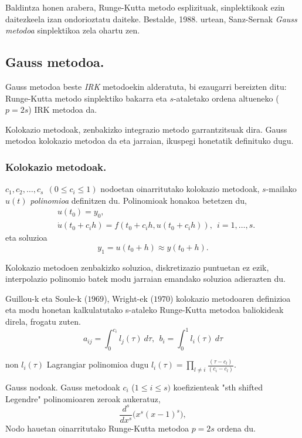 Baldintza honen arabera, Runge-Kutta metodo esplizituak, sinplektikoak ezin daitezkeela izan ondorioztatu daiteke. Bestalde, 1988. urtean, Sanz-Sernak \emph{Gauss metodoa} sinplektikoa zela ohartu zen. 

\subsection{Gauss metodoa.}

Gauss metodoa beste \emph{IRK} metodoekin alderatuta, bi ezaugarri bereizten ditu:  Runge-Kutta metodo sinplektiko bakarra eta $s$-ataletako ordena altueneko ($p=2s$) IRK metodoa da. 

Kolokazio metodoak, zenbakizko integrazio metodo garrantzitsuak dira. Gauss metodoa kolokazio metodoa da eta jarraian, ikuspegi honetatik definituko dugu. 

\subsubsection*{Kolokazio metodoak.}

$c_1,c_2,\dots,c_s \ \ (0\leq c_i \leq 1)$ nodoetan oinarritutako kolokazio metodoak, $s$-mailako $u(t)$  \emph{polinomioa} definitzen du. Polinomioak honakoa betetzen du,
\begin{align*}
&u(t_0) =y_0, \\
&\dot{u}(t_0+c_ih) =f(t_0+c_i h, u(t_0+c_i h)), \ \ i=1,\dots,s.
\end{align*}
eta soluzioa 
\begin{equation*}
y_1=u(t_0+h)\approx y(t_0+h).
\end{equation*} 

Kolokazio metodoen zenbakizko soluzioa, diskretizazio puntuetan ez ezik, interpolazio polinomio batek modu jarraian emandako soluzioa adierazten du. 

Guillou-k eta Soule-k ($1969$), Wright-ek ($1970$) \cite{Hairer2006} kolokazio metodoaren definizioa eta modu honetan kalkulatutako s-ataleko Runge-Kutta metodoa baliokideak direla, frogatu zuten.
\begin{equation}
a_{ij}=\int_{0}^{c_i} l_j(\tau) \ d\tau, \ \ b_i=\int_{0}^{1} l_i(\tau) \ d\tau
\end{equation}

non $l_i(\tau)$ Lagrangiar polinomioa dugu $l_i(\tau)=\prod_{l\neq i} \frac{(\tau-c_l)}{(c_i-c_l)}$.

Gauss nodoak. Gauss metodoak $c_i$ ($1 \leq i \leq s)$ koefizienteak "sth shifted Legendre" polinomioaren zeroak aukeratuz,
\begin{equation*}
\frac{d^s}{dx^s} \big(x^s(x-1)^s \big),
\end{equation*} 
Nodo hauetan oinarritutako Runge-Kutta metodoa $p=2s$ ordena du.

